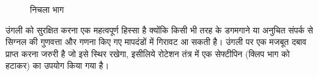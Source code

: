 	
		\begin{figure}[ht!]
			\centering
			\hfill
			\caption{निचला भाग}
		\end{figure}
	
		उंगली को सुरक्षित करना एक महत्वपूर्ण हिस्सा है क्योंकि किसी भी तरह के डगमगाने या अनुचित संपर्क से सिग्नल की गुणवत्ता और गणना किए गए मापदंडों में गिरावट आ सकती है। उंगली पर एक मजबूत दबाव प्राप्त करना जरुरी है जो इसे स्थिर रखेगा, इसीलिये रोटेशन तंत्र में एक सेफ्टीपिन (क्लिप भाग को हटाकर) का उपयोग किया गया है।
		
